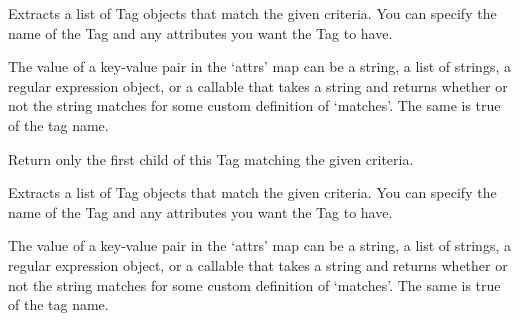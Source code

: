 \documentclass[letterpaper,10pt,english]{sphinxmanual}
\begin{document}
\begin{fulllineitems}
\begin{fulllineitems}
\end{fulllineitems}



\begin{fulllineitems}
\label{SamPy.parsing:SamPy.parsing.BeautifulSoup.Tag.findAll}
Extracts a list of Tag objects that match the given
criteria.  You can specify the name of the Tag and any
attributes you want the Tag to have.

The value of a key-value pair in the `attrs' map can be a
string, a list of strings, a regular expression object, or a
callable that takes a string and returns whether or not the
string matches for some custom definition of `matches'. The
same is true of the tag name.

\end{fulllineitems}



\begin{fulllineitems}
\label{SamPy.parsing:SamPy.parsing.BeautifulSoup.Tag.findChild}
Return only the first child of this Tag matching the given
criteria.

\end{fulllineitems}



\begin{fulllineitems}
\label{SamPy.parsing:SamPy.parsing.BeautifulSoup.Tag.findChildren}
Extracts a list of Tag objects that match the given
criteria.  You can specify the name of the Tag and any
attributes you want the Tag to have.

The value of a key-value pair in the `attrs' map can be a
string, a list of strings, a regular expression object, or a
callable that takes a string and returns whether or not the
string matches for some custom definition of `matches'. The
same is true of the tag name.

\end{fulllineitems}



\end{fulllineitems}
\end{document}
